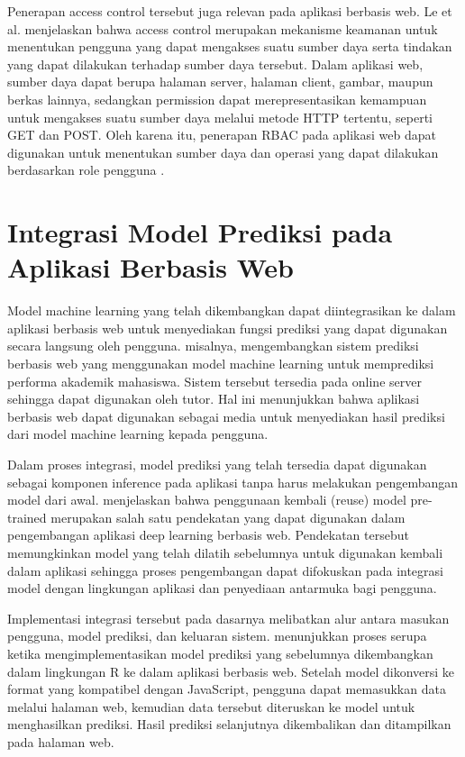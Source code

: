 Penerapan access control tersebut juga relevan pada aplikasi berbasis web. Le et al. menjelaskan bahwa access control merupakan mekanisme keamanan untuk menentukan pengguna yang dapat mengakses suatu sumber daya serta tindakan yang dapat dilakukan terhadap sumber daya tersebut. Dalam aplikasi web, sumber daya dapat berupa halaman server, halaman client, gambar, maupun berkas lainnya, sedangkan permission dapat merepresentasikan kemampuan untuk mengakses suatu sumber daya melalui metode HTTP tertentu, seperti GET dan POST. Oleh karena itu, penerapan RBAC pada aplikasi web dapat digunakan untuk menentukan sumber daya dan operasi yang dapat dilakukan berdasarkan role pengguna \parencite{Le2022}.

\section{Integrasi Model Prediksi pada Aplikasi Berbasis Web}

Model machine learning yang telah dikembangkan dapat diintegrasikan ke dalam aplikasi berbasis web untuk menyediakan fungsi prediksi yang dapat digunakan secara langsung oleh pengguna. \cite{Alboaneen2022} misalnya, mengembangkan sistem prediksi berbasis web yang menggunakan model machine learning untuk memprediksi performa akademik mahasiswa. Sistem tersebut tersedia pada online server sehingga dapat digunakan oleh tutor. Hal ini menunjukkan bahwa aplikasi berbasis web dapat digunakan sebagai media untuk menyediakan hasil prediksi dari model machine learning kepada pengguna.

Dalam proses integrasi, model prediksi yang telah tersedia dapat digunakan sebagai komponen inference pada aplikasi tanpa harus melakukan pengembangan model dari awal. \cite{Goh2023} menjelaskan bahwa penggunaan kembali (reuse) model pre-trained merupakan salah satu pendekatan yang dapat digunakan dalam pengembangan aplikasi deep learning berbasis web. Pendekatan tersebut memungkinkan model yang telah dilatih sebelumnya untuk digunakan kembali dalam aplikasi sehingga proses pengembangan dapat difokuskan pada integrasi model dengan lingkungan aplikasi dan penyediaan antarmuka bagi pengguna.

Implementasi integrasi tersebut pada dasarnya melibatkan alur antara masukan pengguna, model prediksi, dan keluaran sistem. \cite{Mohammed2022} menunjukkan proses serupa ketika mengimplementasikan model prediksi yang sebelumnya dikembangkan dalam lingkungan R ke dalam aplikasi berbasis web. Setelah model dikonversi ke format yang kompatibel dengan JavaScript, pengguna dapat memasukkan data melalui halaman web, kemudian data tersebut diteruskan ke model untuk menghasilkan prediksi. Hasil prediksi selanjutnya dikembalikan dan ditampilkan pada halaman web.

